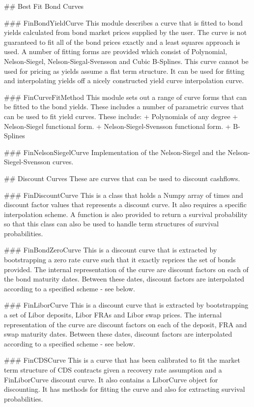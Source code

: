 \documentclass[twoside,11pt]{book}
\begin{document}
## Best Fit Bond Curves

### FinBondYieldCurve
This module describes a curve that is fitted to bond yields calculated from bond market prices supplied by the user. The curve is not guaranteed to fit all of the bond prices exactly and a least squares approach is used. A number of fitting forms are provided which consist of Polynomial, Nelson-Siegel, Nelson-Siegal-Svensson and Cubic B-Splines. This curve cannot be used for pricing as yields assume a flat term structure. It can be used for fitting and interpolating yields off a nicely constructed yield curve interpolation curve.

### FinCurveFitMethod
This module sets out a range of curve forms that can be fitted to the bond yields. These includes a number of parametric curves that can be used to fit yield curves. These include:
+ Polynomials of any degree 
+ Nelson-Siegel functional form. 
+ Nelson-Siegel-Svensson functional form.
+ B-Splines

### FinNelsonSiegelCurve
Implementation of the Nelson-Siegel and the Nelson-Siegel-Svensson curves.

## Discount Curves
These are curves that can be used to discount cashflows.

### FinDiscountCurve
This is a class that holds a Numpy array of times and discount factor values that represents a discount curve. It also requires a specific interpolation scheme. A function is also provided to return a survival probability so that this class can also be used to handle term structures of survival probabilities.

### FinBondZeroCurve
This is a discount curve that is extracted by bootstrapping a zero rate curve such that it exactly reprices the set of bonds provided. The internal representation of the curve are discount factors on each of the bond maturity dates. Between these dates, discount factors are interpolated according to a specified scheme - see below.

### FinLiborCurve
This is a discount curve that is extracted by bootstrapping a set of Libor deposits, Libor FRAs and Libor swap prices. The internal representation of the curve are discount factors on each of the deposit, FRA and swap maturity dates. Between these dates, discount factors are interpolated according to a specified scheme - see below.

### FinCDSCurve
This is a curve that has been calibrated to fit the market term structure of CDS contracts given a recovery rate assumption and a FinLiborCurve discount curve. It also contains a LiborCurve object for discounting. It has methods for fitting the curve and also for extracting survival probabilities.
\end{document}
